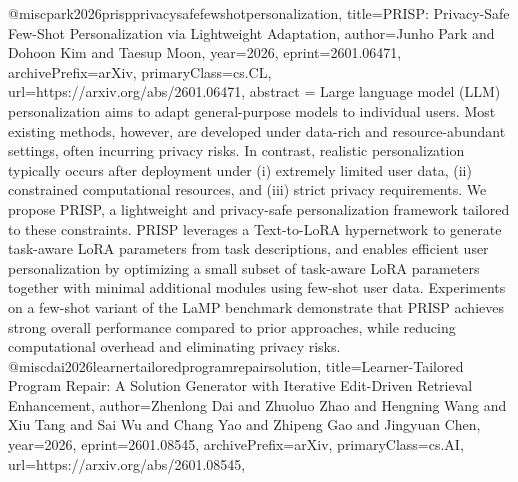 {}@misc{park2026prispprivacysafefewshotpersonalization,
      title={PRISP: Privacy-Safe Few-Shot Personalization via Lightweight Adaptation}, 
      author={Junho Park and Dohoon Kim and Taesup Moon},
      year={2026},
      eprint={2601.06471},
      archivePrefix={arXiv},
      primaryClass={cs.CL},
      url={https://arxiv.org/abs/2601.06471},
      abstract = {Large language model (LLM) personalization aims to adapt general-purpose models to individual users. Most existing methods, however, are developed under data-rich and resource-abundant settings, often incurring privacy risks. In contrast, realistic personalization typically occurs after deployment under (i) extremely limited user data, (ii) constrained computational resources, and (iii) strict privacy requirements. We propose PRISP, a lightweight and privacy-safe personalization framework tailored to these constraints. PRISP leverages a Text-to-LoRA hypernetwork to generate task-aware LoRA parameters from task descriptions, and enables efficient user personalization by optimizing a small subset of task-aware LoRA parameters together with minimal additional modules using few-shot user data. Experiments on a few-shot variant of the LaMP benchmark demonstrate that PRISP achieves strong overall performance compared to prior approaches, while reducing computational overhead and eliminating privacy risks.}
}@misc{dai2026learnertailoredprogramrepairsolution,
      title={Learner-Tailored Program Repair: A Solution Generator with Iterative Edit-Driven Retrieval Enhancement}, 
      author={Zhenlong Dai and Zhuoluo Zhao and Hengning Wang and Xiu Tang and Sai Wu and Chang Yao and Zhipeng Gao and Jingyuan Chen},
      year={2026},
      eprint={2601.08545},
      archivePrefix={arXiv},
      primaryClass={cs.AI},
      url={https://arxiv.org/abs/2601.08545},
}
